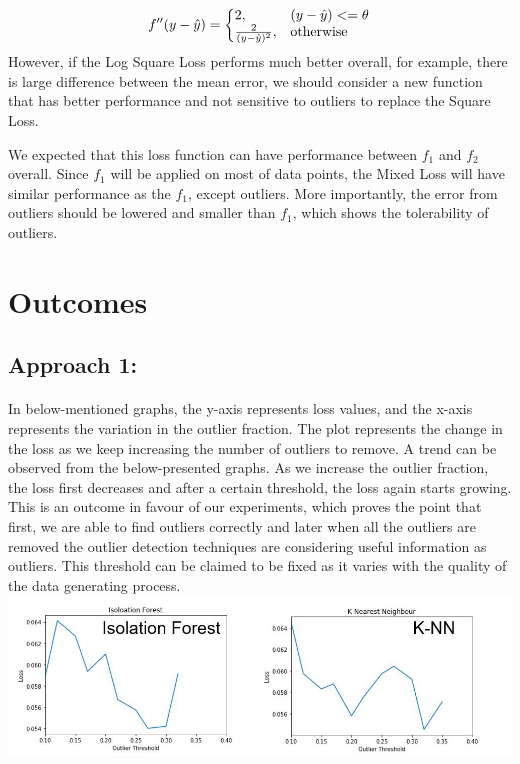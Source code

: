 \documentclass[runningheads]{llncs}
\begin{document}
\begin{equation}
  f''(y - \hat{y})=\left\{
  \begin{array}{@{}ll@{}}
    2, & (y - \hat{y})<=\theta \\
    \frac{2}{(y - \hat{y})^2}, & \text{otherwise}
  \end{array}\right.
\end{equation}
However, if the Log Square Loss performs much better overall, for example, there is large difference between the mean error, we should consider a new function that has better performance and not sensitive to outliers to replace the Square Loss.

We expected that this loss function can have performance between $f_1$ and $f_2$ overall. Since $f_1$ will be applied on most of data points, the Mixed Loss will have similar performance as the $f_1$, except outliers. More importantly, the error from outliers should be lowered and smaller than $f_1$, which shows the tolerability of outliers.


\section{Outcomes}
\subsection{Approach 1:}
\paragraph{} In below-mentioned graphs, the y-axis represents loss values, and the x-axis represents the variation in the outlier fraction. The plot represents the change in the loss as we keep increasing the number of outliers to remove. A trend can be observed from the below-presented graphs.  As we increase the outlier fraction, the loss first decreases and after a certain threshold, the loss again starts growing. This is an outcome in favour of our experiments, which proves the point that first, we are able to find outliers correctly and later when all the outliers are removed the outlier detection techniques are considering useful information as outliers. This threshold can be claimed to be fixed as it varies with the quality of the data generating process. \\
\includegraphics[scale=0.37]{tt2.jpg}
\end{document}
